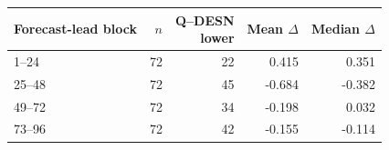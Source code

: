 \begingroup
\TableStyle
\scriptsize
\setlength{\tabcolsep}{3pt}
\begin{tabular}{@{}lrrrr@{}}
\toprule
Forecast-lead block & $n$ & \shortstack{Q--DESN\\lower} & \shortstack{Mean\\$\Delta$} & \shortstack{Median\\$\Delta$} \\
\midrule
1--24 & 72 & 22 & 0.415 & 0.351 \\
25--48 & 72 & 45 & -0.684 & -0.382 \\
49--72 & 72 & 34 & -0.198 & 0.032 \\
73--96 & 72 & 42 & -0.155 & -0.114 \\
\bottomrule
\end{tabular}
\endgroup
